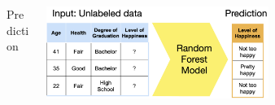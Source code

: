\documentclass[11pt,compress,t,notes=noshow, xcolor=table]{beamer}
\begin{document}
\begin{vbframe}
\begin{columns}
\begin{column}{0.05\textwidth} 
\begin{center}
\vspace{0.7cm}
Prediction
\end{center}
\end{column}
\begin{column}{0.95\textwidth} 
\begin{center}
  \includegraphics[width = 0.6\textwidth]{slides/forests/figure_man/nutshell-randomforest-prediction.png} 
\end{center}
\end{column}
\end{columns}

\end{vbframe} 

\end{document}
